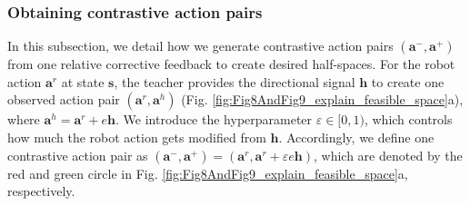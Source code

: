 
 
 
 \subsubsection{Obtaining contrastive action pairs}
\label{sec:sub:CLIC_one_corrective_feedback}
In this subsection, we detail how we generate contrastive action pairs $(\bm a^{-}, \bm a^{+})$ from one relative corrective feedback to create desired half-spaces. 
 For the robot action $\bm a^r$ at state $\bm s$, the teacher provides the directional signal $\bm h$ to create one observed action pair  $(\bm a^r, \bm a^h)$ (Fig. \ref{fig:Fig8AndFig9_explain_feasible_space}a), where $\bm a^h = \bm a^r + e \bm h.$
We introduce the hyperparameter 
$\varepsilon \in [0, 1)$, which 
controls how much the robot action gets modified from $\bm h$.
Accordingly, we define one contrastive action pair
as $(\bm a^-, \bm a^+) = (\bm a^r, \bm a^r + \varepsilon e\bm h)$, which are denoted by the red and green circle in Fig. \ref{fig:Fig8AndFig9_explain_feasible_space}a, respectively.


